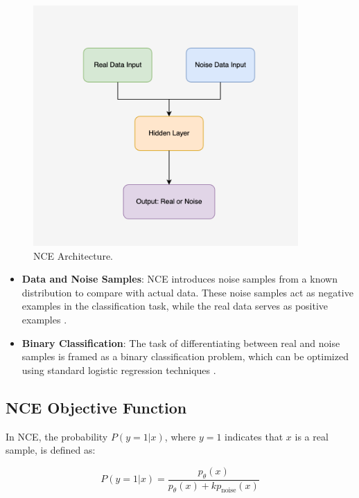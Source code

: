 \begin{figure}[H]
    \centering
    \includegraphics[width=0.9\textwidth]{./Images/NCE_structure.jpg}
    \caption{NCE Architecture.}
    \label{fig:NCE_structure}
\end{figure}

\begin{itemize}
    \item \textbf{Data and Noise Samples}: NCE introduces noise samples from a known distribution to compare with actual data. These noise samples act as negative examples in the classification task, while the real data serves as positive examples \citep{10.48550/arxiv.1711.00658}.
    \item \textbf{Binary Classification}: The task of differentiating between real and noise samples is framed as a binary classification problem, which can be optimized using standard logistic regression techniques \citep{10.18653/v1/e17-2003}.
\end{itemize}

\subsection{NCE Objective Function}
In NCE, the probability \( P(y = 1 | x) \), where \( y = 1 \) indicates that \( x \) is a real sample, is defined as:

\begin{equation}
P(y = 1 | x) = \frac{p_{\theta}(x)}{p_{\theta}(x) + k p_{\text{noise}}(x)}
\end{equation}

